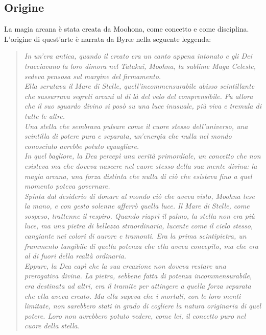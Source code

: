 \documentclass[a4paper]{report}
\begin{document}
\begin{multicols}{2}

\section{Origine} 
La magia arcana è stata creata da Moohona, come concetto e come disciplina. L'origine di quest'arte è narrata da Byrœ nella seguente leggenda:

\begin{verse}
	
\textit{In un'era antica, quando il creato era un canto appena intonato e gli Dei tracciavano la loro dimora nel Tatakai, Moohna, la sublime Maga Celeste, sedeva pensosa sul margine del firmamento.\\ Ella scrutava il Mare di Stelle, quell’incommensurabile abisso scintillante che sussurrava segreti arcani al di là del velo del comprensibile.
Fu allora che il suo sguardo divino si posò su una luce inusuale, più viva e tremula di tutte le altre.\\ Una stella che sembrava pulsare come il cuore stesso dell'universo, una scintilla di potere pura e separata, un'energia che nulla nel mondo conosciuto avrebbe potuto eguagliare.\\ In quel bagliore, la Dea percepì una verità primordiale, un concetto che non esisteva ma che doveva nascere nel cuore stesso della sua mente divina: la magia arcana, una forza distinta che nulla di ciò che esisteva fino a quel momento poteva governare.\\ Spinta dal desiderio di donare al mondo ciò che aveva visto, Moohna tese la mano, e con gesto solenne afferrò quella luce. Il Mare di Stelle, come sospeso, trattenne il respiro. Quando riaprì il palmo, la stella non era più luce, ma una pietra di bellezza straordinaria, lucente come il cielo stesso, cangiante nei colori di aurore e tramonti. Era la prima scintipietra, un frammento tangibile di quella potenza che ella aveva concepito, ma che era al di fuori della realtà ordinaria.\\
Eppure, la Dea capì che la sua creazione non doveva restare una prerogativa divina. La pietra, sebbene fatta di potenza incommensurabile, era destinata ad altri, era il tramite per attingere a quella forza separata che ella aveva creato. Ma ella sapeva che i mortali, con le loro menti limitate, non sarebbero stati in grado di cogliere la natura originaria di quel potere. Loro non avrebbero potuto vedere, come lei, il concetto puro nel cuore della stella. \\
}
\end{verse}
\end{multicols}
\end{document}
